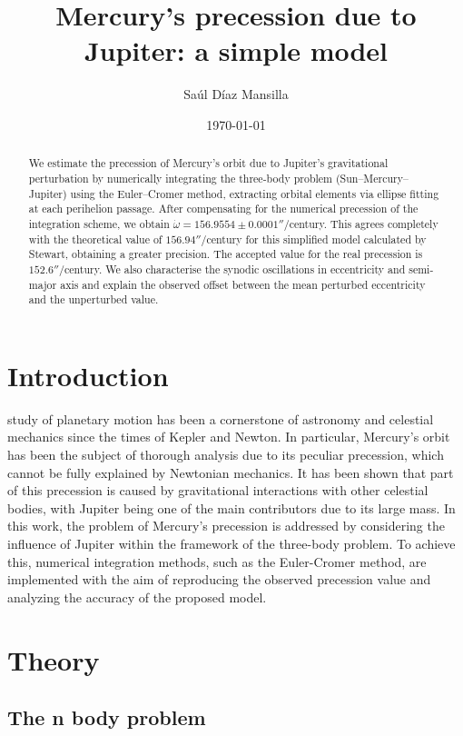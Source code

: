 \documentclass[journal]{IEEEtran}
\title{Mercury's precession due to Jupiter: a simple model}
\author{Saúl Díaz Mansilla}
\date{\today}
\begin{document}
\setcounter{secnumdepth}{3}
\maketitle

\begin{abstract}
    We estimate the precession of Mercury's orbit due to Jupiter's gravitational perturbation by numerically integrating the three-body problem (Sun--Mercury--Jupiter) using the Euler--Cromer method, extracting orbital elements via ellipse fitting at each perihelion passage. After compensating for the numerical precession of the integration scheme, we obtain $\dot\omega = 156.9554 \pm 0.0001''/$century. This agrees completely with the theoretical value of $156.94''/$century for this simplified model calculated by Stewart, obtaining a greater precision. The accepted value for the real precession is $152.6''/$century. We also characterise the synodic oscillations in eccentricity and semi-major axis and explain the observed offset between the mean perturbed eccentricity and the unperturbed value.
\end{abstract}

\section{Introduction}

 study of planetary motion has been a cornerstone of astronomy and celestial mechanics since the times of Kepler and Newton. In particular, Mercury's orbit has been the subject of thorough analysis due to its peculiar precession, which cannot be fully explained by Newtonian mechanics. It has been shown that part of this precession is caused by gravitational interactions with other celestial bodies, with Jupiter being one of the main contributors due to its large mass. In this work, the problem of Mercury's precession is addressed by considering the influence of Jupiter within the framework of the three-body problem. To achieve this, numerical integration methods, such as the Euler-Cromer method, are implemented with the aim of reproducing the observed precession value and analyzing the accuracy of the proposed model.



\section{Theory}\label{sec:theory}

\subsection{The n body problem}
\end{document}
